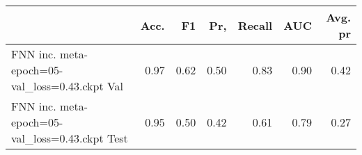 \begin{tabular}{lrrrrrr}
\toprule
{} &  Acc. &    F1 &   Pr, &  Recall &   AUC &  Avg. pr \\
\midrule
FNN inc. meta-epoch=05-val\_loss=0.43.ckpt Val  &  0.97 &  0.62 &  0.50 &    0.83 &  0.90 &     0.42 \\
FNN inc. meta-epoch=05-val\_loss=0.43.ckpt Test &  0.95 &  0.50 &  0.42 &    0.61 &  0.79 &     0.27 \\
\bottomrule
\end{tabular}
